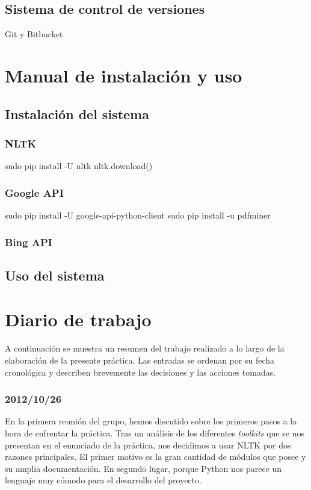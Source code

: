 \documentclass[12pt,a4paper,titlepage]{article}
\begin{document}
\subsection{Sistema de control de versiones}
Git y Bitbucket


\newpage
\section{Manual de instalación y uso}

\subsection{Instalación del sistema}

\subsubsection{NLTK}
sudo pip install -U nltk
nltk.download()

\subsubsection{Google API}
sudo pip install -U google-api-python-client
sudo pip install -u pdfminer

\subsubsection{Bing API}



\subsection{Uso del sistema}



\newpage
\section{Diario de trabajo}
A continuación se muestra un resumen del trabajo realizado a lo largo de la elaboración de la presente práctica. Las entradas se ordenan por su fecha cronológica y describen brevemente las decisiones y las acciones tomadas.


\subsubsection*{2012/10/26}
En la primera reunión del grupo, hemos discutido sobre los primeros pasos a la hora de enfrentar la práctica. Tras un análisis de los diferentes \emph{toolkits} que se nos presentan en el enunciado de la práctica, nos decidimos a usar NLTK por dos razones principales. El primer motivo es la gran cantidad de módulos que posee y su amplia documentación. En segundo lugar, porque Python nos parece un lenguaje muy cómodo para el desarrollo del proyecto.
\end{document}
